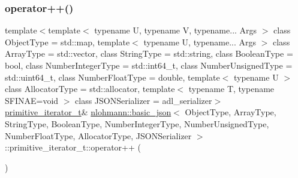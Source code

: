 \subsubsection{\texorpdfstring{operator++()}{operator++()}\hspace{0.1cm}{\footnotesize\ttfamily [1/2]}}
{\footnotesize\ttfamily template$<$template$<$ typename U, typename V, typename... Args $>$ class Object\+Type = std\+::map, template$<$ typename U, typename... Args $>$ class Array\+Type = std\+::vector, class String\+Type  = std\+::string, class Boolean\+Type  = bool, class Number\+Integer\+Type  = std\+::int64\+\_\+t, class Number\+Unsigned\+Type  = std\+::uint64\+\_\+t, class Number\+Float\+Type  = double, template$<$ typename U $>$ class Allocator\+Type = std\+::allocator, template$<$ typename T, typename S\+F\+I\+N\+A\+E=void $>$ class J\+S\+O\+N\+Serializer = adl\+\_\+serializer$>$ \\
\hyperlink{classnlohmann_1_1basic__json_1_1primitive__iterator__t}{primitive\+\_\+iterator\+\_\+t}\& \hyperlink{classnlohmann_1_1basic__json}{nlohmann\+::basic\+\_\+json}$<$ Object\+Type, Array\+Type, String\+Type, Boolean\+Type, Number\+Integer\+Type, Number\+Unsigned\+Type, Number\+Float\+Type, Allocator\+Type, J\+S\+O\+N\+Serializer $>$\+::primitive\+\_\+iterator\+\_\+t\+::operator++ (\begin{DoxyParamCaption}{ }\end{DoxyParamCaption})\hspace{0.3cm}{\ttfamily [inline]}}

\mbox{\label{classnlohmann_1_1basic__json_1_1primitive__iterator__t_a6037e167f0306a815ae6b53b290c39a7}} 
